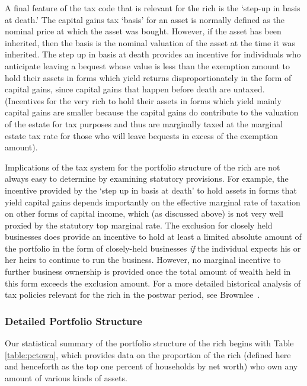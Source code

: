 \documentclass[12pt]{article}
\begin{document}
A final feature of the tax code that is relevant for the rich is the
`step-up in basis at death.' The capital gains tax `basis' for an asset is
normally defined as the nominal price at which the asset was bought.
However, if the asset has been inherited, then the basis is the nominal
valuation of the asset at the time it was inherited. The step up in basis at
death provides an incentive for individuals who anticipate leaving a bequest
whose value is less than the exemption amount to hold their assets in forms
which yield returns disproportionately in the form of capital gains, since
capital gains that happen before death are untaxed. (Incentives for the very
rich to hold their assets in forms which yield mainly capital gains are
smaller because the capital gains do contribute to the valuation of the
estate for tax purposes and thus are marginally taxed at the marginal estate
tax rate for those who will leave bequests in excess of the exemption
amount).

Implications of the tax system for the portfolio structure of the rich are
not always easy to determine by examining statutory provisions. For example,
the incentive provided by the `step up in basis at death' to hold assets in
forms that yield capital gains depends importantly on the effective marginal
rate of taxation on other forms of capital income, which (as discussed
above) is not very well proxied by the statutory top marginal rate. The
exclusion for closely held businesses does provide an incentive to hold at
least a limited absolute amount of the portfolio in the form of closely-held
businesses \textit{if} the individual expects his or her heirs to continue
to run the business. However, no marginal incentive to further business
ownership is provided once the total amount of wealth held in this form
exceeds the exclusion amount. For a more detailed historical analysis of tax
policies relevant for the rich in the postwar period, see Brownlee~\cite
{brownlee:historical}.

\subsubsection{Detailed Portfolio Structure}

Our statistical summary of the portfolio structure of the rich begins with
Table \ref{table:pctown}, which provides data on the proportion of the rich
(defined here and henceforth as the top one percent of households by net
worth) who own any amount of various kinds of assets.
\end{document}
